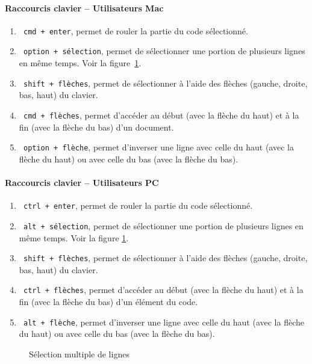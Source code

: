 \documentclass[10.5pt,a4paper]{article}
\newcommand{\rcode}[1]{\texttt{\color{rstudio} #1}}
\begin{document}
      \paragraph{Raccourcis clavier -- Utilisateurs Mac}
      \begin{enumerate}
        \item \rcode{cmd + enter}, permet de rouler la partie du code sélectionné.
        \item \rcode{option + sélection}, permet de sélectionner une portion de plusieurs lignes en même temps. Voir la figure~\ref{altSelect}.
        \item \rcode{shift + flèches}, permet de sélectionner à l'aide des flèches (gauche, droite, bas, haut) du clavier.
        \item \rcode{cmd + flèches}, permet d'accéder au début (avec la flèche du haut) et à la fin (avec la flèche du bas) d'un document.
        \item \rcode{option + flèche}, permet d'inverser une ligne avec celle du haut (avec la flèche du haut) ou avec celle du bas (avec la flèche du bas).
      \end{enumerate}
      
      \paragraph{Raccourcis clavier -- Utilisateurs PC}
      \begin{enumerate}
        \item \rcode{ctrl + enter}, permet de rouler la partie du code sélectionné.
        \item \rcode{alt + sélection}, permet de sélectionner une portion de plusieurs lignes en même temps. Voir la figure \ref{altSelect}.
        \item \rcode{shift + flèches}, permet de sélectionner à l'aide des flèches (gauche, droite, bas, haut) du clavier.
        \item \rcode{ctrl + flèches}, permet d'accéder au début (avec la flèche du haut) et à la fin (avec la flèche du bas) d'un élément du code.
        \item \rcode{alt + flèche}, permet d'inverser une ligne avec celle du haut (avec la flèche du haut) ou avec celle du bas (avec la flèche du bas).
      \end{enumerate}
      
            \begin{figure}[H]
      \centering
      \caption{Sélection multiple de lignes}
      \label{altSelect}
      \end{figure}
      
\end{document}
